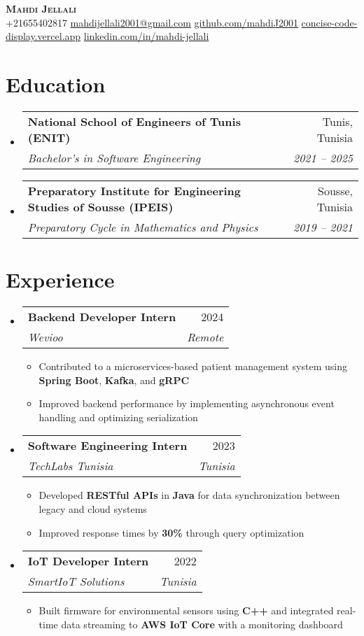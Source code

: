 \documentclass[letterpaper,11pt]{article}
\makeatletter
\newcommand{\resumeItem}[1]{
    \item\small{
            {#1 \vspace{-2pt}}
    }
}
\newcommand{\resumeSubheading}[4]{
    \vspace{-2pt}\item
    \begin{tabular*}{0.97\textwidth}[t]{l@{\extracolsep{\fill}}r}
    \textbf{#1} & #2 \\
    \textit{\small#3} & \textit{\small #4} \\
    \end{tabular*}\vspace{-7pt}
}
\newcommand{\resumeSubHeadingListStart}{\begin{itemize}[leftmargin=0.15in, label={}]}
\newcommand{\resumeSubHeadingListEnd}{\end{itemize}}
\newcommand{\resumeItemListStart}{\begin{itemize}}
\newcommand{\resumeItemListEnd}{\end{itemize}\vspace{-5pt}}
\makeatother
\begin{document}
\begin{center}
\textbf{\Huge \scshape Mahdi Jellali} \\ \vspace{1pt}
\small
+21655402817 \quad
\href{mailto:mahdijellali2001@gmail.com}{mahdijellali2001@gmail.com} \quad
\href{https://github.com/mahdiJ2001}{github.com/mahdiJ2001} \quad
\href{https://concise-code-display.vercel.app/}{concise-code-display.vercel.app} \quad
\href{https://www.linkedin.com/in/mahdi-jellali/}{linkedin.com/in/mahdi-jellali}
\end{center}

\vspace{10pt}
\section{Education}
\resumeSubHeadingListStart
\resumeSubheading
{National School of Engineers of Tunis (ENIT)}{Tunis, Tunisia}
{Bachelor’s in Software Engineering}{2021 -- 2025}
\resumeSubheading
{Preparatory Institute for Engineering Studies of Sousse (IPEIS)}{Sousse, Tunisia}
{Preparatory Cycle in Mathematics and Physics}{2019 -- 2021}
\resumeSubHeadingListEnd

\section{Experience}
\resumeSubHeadingListStart
\resumeSubheading
{Backend Developer Intern}{2024}
{Wevioo}{Remote}
\resumeItemListStart
\resumeItem{Contributed to a microservices-based patient management system using \textbf{Spring Boot}, \textbf{Kafka}, and \textbf{gRPC}}
\resumeItem{Improved backend performance by implementing asynchronous event handling and optimizing serialization}
\resumeItemListEnd
\resumeSubheading
{Software Engineering Intern}{2023}
{TechLabs Tunisia}{Tunisia}
\resumeItemListStart
\resumeItem{Developed \textbf{RESTful APIs} in \textbf{Java} for data synchronization between legacy and cloud systems}
\resumeItem{Improved response times by \textbf{30\%} through query optimization}
\resumeItemListEnd
\resumeSubheading
{IoT Developer Intern}{2022}
{SmartIoT Solutions}{Tunisia}
\resumeItemListStart
\resumeItem{Built firmware for environmental sensors using \textbf{C++} and integrated real-time data streaming to \textbf{AWS IoT Core} with a monitoring dashboard}
\resumeItemListEnd
\resumeSubHeadingListEnd

\end{document}
